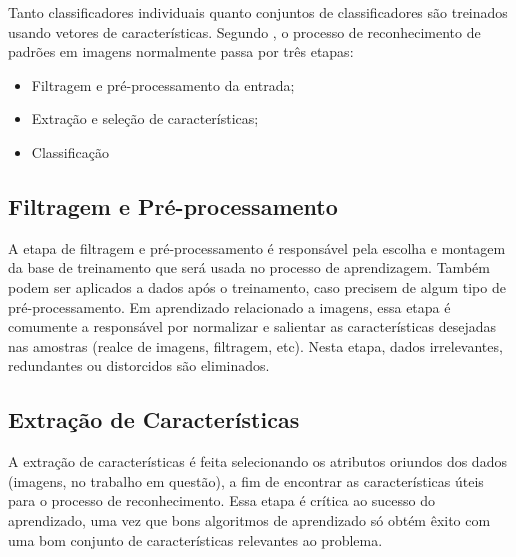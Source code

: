 



Tanto classificadores individuais quanto conjuntos de classificadores são treinados usando vetores de características. Segundo \cite{jain:1989}, o processo de reconhecimento de padrões em imagens normalmente passa por três etapas: 
\begin{itemize}
    \item Filtragem e pré-processamento da entrada;
    \item Extração e seleção de características;
    \item Classificação
\end{itemize}

\subsection{Filtragem e Pré-processamento}

A etapa de filtragem e pré-processamento é responsável pela escolha e montagem da base de treinamento que será usada no processo de aprendizagem. Também podem ser aplicados a dados após o treinamento, caso precisem de algum tipo de pré-processamento. Em aprendizado relacionado a imagens, essa etapa é comumente a responsável por normalizar e salientar as características desejadas nas amostras (realce de imagens, filtragem, etc). Nesta etapa, dados irrelevantes, redundantes ou distorcidos são eliminados.

\subsection{Extração de Características}

A extração de características é feita selecionando os atributos oriundos dos dados (imagens, no trabalho em questão), a fim de encontrar as características úteis para o processo de reconhecimento. Essa etapa é crítica ao sucesso do aprendizado, uma vez que bons algoritmos de aprendizado só obtém êxito com uma bom conjunto de características relevantes ao problema.


